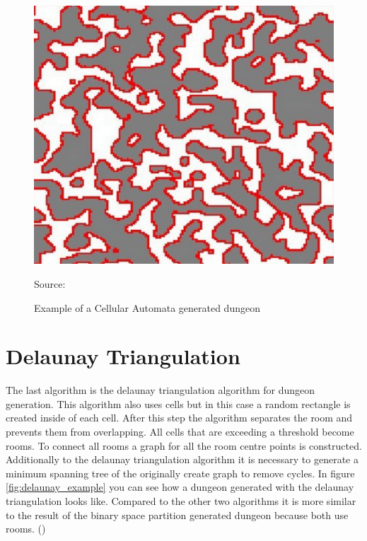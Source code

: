 \documentclass[a4paper,12pt,oneside]{scrreprt}
\begin{document}
\begin{figure}[htb]
\centering
\includegraphics[scale=0.5]{images/cellular_automata_example.png} 
\caption{Example of a Cellular Automata generated dungeon}
Source: \cite[][]{williams_investigation_nodate}
\label{fig:cellular_automata_example}
\end{figure}

\newpage
\section{Delaunay Triangulation}
The last algorithm is the delaunay triangulation algorithm for dungeon generation. This algorithm also uses cells but in this case a random rectangle is created inside of each cell. After this step the algorithm separates the room and prevents them from overlapping. All cells that are exceeding a threshold become rooms. To connect all rooms a graph for all the room centre points is constructed. Additionally to the delaunay triangulation algorithm it is necessary to generate a minimum spanning tree of the originally create graph to remove cycles. In figure \ref{fig:delaunay_example} you can see how a dungeon generated with the delaunay triangulation looks like. Compared to the other two algorithms it is more similar to the result of the binary space partition generated dungeon because both use rooms. (\cite[][]{williams_investigation_nodate})
\end{document}

